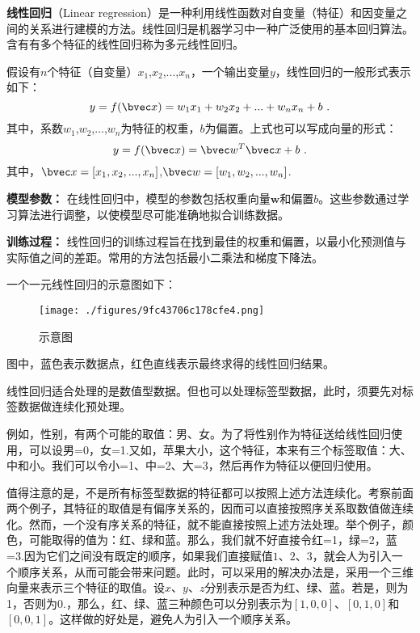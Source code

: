 

\textbf{线性回归}（Linear regression）是一种利用线性函数对自变量（特征）和因变量之间的关系进行建模的方法。线性回归是机器学习中一种广泛使用的基本回归算法。含有有多个特征的线性回归称为多元线性回归。

假设有$n$个特征（自变量）$x_1$,$x_2$,...,$x_n$，一个输出变量$y$，线性回归的一般形式表示如下：
\begin{equation}
y=f(\bvec x)=w_1x_1+w_2x_2+...+w_nx_n+b~.
\end{equation}
其中，系数$w_1$,$w_2$,...,$w_n$为特征的权重，$b$为偏置。上式也可以写成向量的形式：
\begin{equation}
y=f(\bvec x)=\bvec w^T\bvec x+b~.
\end{equation}
其中，$\bvec x = [x_1,x_2,...,x_n]$,$\bvec w = [w_1,w_2,...,w_n]$.

\textbf{模型参数：} 在线性回归中，模型的参数包括权重向量$\mathbf{w}$和偏置$b$。这些参数通过学习算法进行调整，以使模型尽可能准确地拟合训练数据。

\textbf{训练过程：} 线性回归的训练过程旨在找到最佳的权重和偏置，以最小化预测值与实际值之间的差距。常用的方法包括最小二乘法和梯度下降法。

一个一元线性回归的示意图如下：
\begin{figure}[ht]
\centering
\texttt{[image: ./figures/9fc43706c178cfe4.png]}
\caption{示意图} \label{fig_LiGr_1}
\end{figure}
图中，蓝色表示数据点，红色直线表示最终求得的线性回归结果。

线性回归适合处理的是数值型数据。但也可以处理标签型数据，此时，须要先对标签数据做连续化预处理。

例如，性别，有两个可能的取值：男、女。为了将性别作为特征送给线性回归使用，可以设男=0，女=1.又如，苹果大小，这个特征，本来有三个标签取值：大、中和小。我们可以令小=1、中=2、大=3，然后再作为特征以便回归使用。

值得注意的是，不是所有标签型数据的特征都可以按照上述方法连续化。考察前面两个例子，其特征的取值是有偏序关系的，因而可以直接按照序关系取数值做连续化。然而，一个没有序关系的特征，就不能直接按照上述方法处理。举个例子，颜色，可能取得的值为：红、绿和蓝。那么，我们就不好直接令红=1，绿=2，蓝=3.因为它们之间没有既定的顺序，如果我们直接赋值$1$、$2$、$3$，就会人为引入一个顺序关系，从而可能会带来问题。此时，可以采用的解决办法是，采用一个三维向量来表示三个特征的取值。设$x$、$y$、$z$分别表示是否为红、绿、蓝。若是，则为1，否则为0.，那么，红、绿、蓝三种颜色可以分别表示为$[1,0,0]$、$[0,1,0]$和$[0,0,1]$。这样做的好处是，避免人为引入一个顺序关系。
